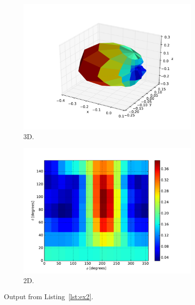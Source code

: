 

\begin{figure}[htbp]
    \centering
    \begin{subfigure}{0.49\linewidth}
        \centering
        \includegraphics[scale=0.5]{sec/post_processing/examples/ex2_3dfarfield.pdf}
        \caption{3D.}
    \end{subfigure}
    \hfill
    \begin{subfigure}{0.49\linewidth}
        \centering
        \includegraphics[scale=0.5]{sec/post_processing/examples/ex2_2dfarfield.pdf}
        \caption{2D.}
    \end{subfigure}
    \caption{Output from Listing~\ref{lst:ex2}.}
    \label{fig:pp_example2}
\end{figure}

